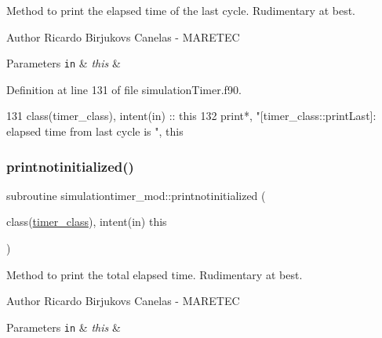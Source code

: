 Method to print the elapsed time of the last cycle. Rudimentary at best. 

\begin{DoxyAuthor}{Author}
Ricardo Birjukovs Canelas -\/ M\+A\+R\+E\+T\+EC 
\end{DoxyAuthor}

\begin{DoxyParams}[1]{Parameters}
\mbox{\tt in}  & {\em this} & \\
\hline
\end{DoxyParams}


Definition at line 131 of file simulation\+Timer.\+f90.


\begin{DoxyCode}
131     \textcolor{keywordtype}{class}(timer\_class), \textcolor{keywordtype}{intent(in)} :: this
132     print*, \textcolor{stringliteral}{"[timer\_class::printLast]: elapsed time from last cycle is "}, this%
\end{DoxyCode}
\mbox{\label{namespacesimulationtimer__mod_a1c7581b4e12efde67021c8d94e0ef696}} 
\subsubsection{\texorpdfstring{printnotinitialized()}{printnotinitialized()}}
{\footnotesize\ttfamily subroutine simulationtimer\+\_\+mod\+::printnotinitialized (\begin{DoxyParamCaption}\item[{class(\mbox{\hyperlink{structsimulationtimer__mod_1_1timer__class}{timer\+\_\+class}}), intent(in)}]{this }\end{DoxyParamCaption})\hspace{0.3cm}{\ttfamily [private]}}



Method to print the total elapsed time. Rudimentary at best. 

\begin{DoxyAuthor}{Author}
Ricardo Birjukovs Canelas -\/ M\+A\+R\+E\+T\+EC 
\end{DoxyAuthor}

\begin{DoxyParams}[1]{Parameters}
\mbox{\tt in}  & {\em this} & \\
\hline
\end{DoxyParams}


